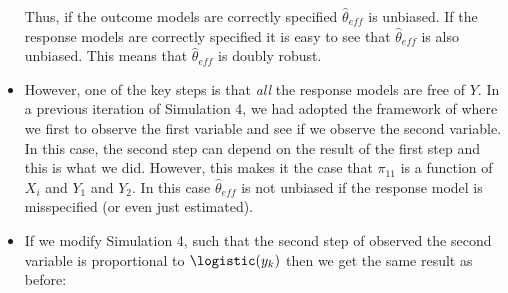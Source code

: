 \begin{itemize}
    Thus, if the outcome models are correctly specified $\hat \theta_{eff}$ is
    unbiased. If the response models are correctly specified it is easy to see
    that $\hat \theta_{eff}$ is also unbiased. This means that $\hat
    \theta_{eff}$ is doubly robust.

  \item However, one of the key steps is that \textit{all} the response
    models are free of $Y$. In a previous iteration of Simulation 4, we had
    adopted the framework of \cite{robins1997non} where we first to observe the
    first variable and see if we observe the second variable. In this case, the
    second step can depend on the result of the first step and this is what we
    did. However, this makes it the case that $\pi_11$ is a function of $X_i$
    and $Y_1$ and $Y_2$. In this case $\hat \theta_{eff}$ is not unbiased if the
    response model is misspecified (or even just estimated).

  \item If we modify Simulation 4, such that the second step of observed the
    second variable is proportional to $\logistic(y_k)$ then we get the same
    result as before:

    
    
    
  
\end{itemize}

\newpage
